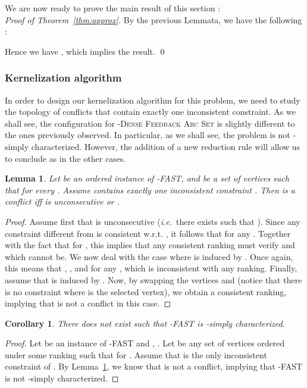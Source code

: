 \documentclass[11pt]{article}
\newtheorem{corollary}[theorem]{Corollary}
\newtheorem{lemma}[theorem]{Lemma}
\def\ie{{\em i.e.}~}
\newcommand{\FASHT}{\textsc{-Dense Feedback Arc Set}}
\begin{document}
We are now ready to prove the main result of this section :\\

\emph{Proof of Theorem~\ref{thm:approx}.} By the previous Lemmata, we have the following :
			
			Hence we have , which implies the result. 
\hfill \qed


 
\subsubsection{Kernelization algorithm}

In order to design our kernelization algorithm for this problem, we need to study the topology of conflicts that contain exactly one inconsistent constraint. As we shall see, the configuration for \FASHT{} is slightly different to the ones previously observed. In particular, as we shall see, the problem is not -simply characterized. However, the addition of a new reduction rule will allow us to conclude as in the other cases.  

\begin{lemma}
\label{lem:fashtconflict}
	Let  be an ordered instance of {\sc -FAST}, and  be a set of  vertices such that  for every . Assume  contains exactly one inconsistent constraint . Then  is a conflict iff  is unconsecutive or .
\end{lemma}

\begin{proof}
	Assume first that  is unconsecutive (\ie there exists  such that ). Since any constraint different from  is consistent w.r.t. , it follows that  for any . Together with the fact that  for , this implies that any consistent ranking  must verify  and  which cannot be.
	We now deal with the case where  is induced by . Once again, this means that , , and  for any , which is inconsistent with any ranking. 
	Finally, assume that  is induced by . Now, by swapping  
	the vertices  and  (notice that there is no constraint where  is 
	the selected vertex), we 
	obtain a consistent ranking, implying that  is not a conflict in this case. 
 \end{proof}
	
\begin{corollary}
\label{coro:fashtlr}
	There does not exist  such that {\sc -FAST} is -simply characterized. 
\end{corollary}

\begin{proof}
	Let  be an instance of {\sc -FAST} and , . 
	Let  be any set of vertices ordered 
under some ranking  such 
that  for . Assume that  is the only inconsistent constraint of . By Lemma~\ref{lem:fashtconflict}, we know that  is not a conflict, implying that -FAST is not -simply 
characterized. 
 \end{proof}
\end{document}
